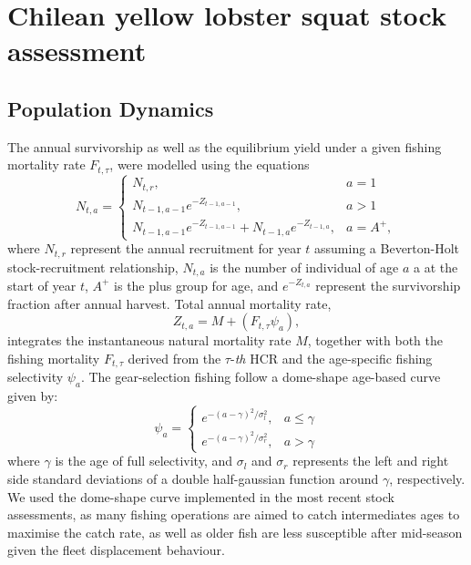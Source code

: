 \setlength{\parindent}{25pt}
\setlength{\parskip}{0em}
\fontsize{11}{14}\selectfont

\clearpage

\appendix
\section{Chilean yellow lobster squat stock assessment} \label{app:model}
\subsection{Population Dynamics}

The annual survivorship as well as the equilibrium 
yield under a given fishing mortality rate $F_{t,\tau}$, were modelled 
using the equations
\[ 
N_{t,a}=\begin{cases} N_{t,r}, & a=1\\
N_{t-1,a-1}e^{-Z_{t-1,a-1}},& a>1\\
N_{t-1,a-1}e^{-Z_{t-1,a-1}} + N_{t-1,a}e^{-Z_{t-1,a}},& a=A^+,
\end{cases}  
\]
where $N_{t,r}$ represent the annual recruitment for year $t$ 
assuming a Beverton-Holt stock-recruitment relationship,  
$N_{t,a}$ is the number of individual 
of age $a$ a at the start of year $t$, $A^+$ is the plus group for age, and $e^{-Z_{t,a}}$ represent
the survivorship fraction after annual harvest. 
Total annual mortality rate,
\[ 
Z_{t,a}= M+\left( F_{t,\tau}\psi_{a}\right), 
\]
integrates the instantaneous 
natural mortality rate $M$, together with both the fishing mortality $F_{t,\tau}$
derived from the $\tau$-\textit{th} HCR and the age-specific 
fishing selectivity $\psi_a$. The gear-selection fishing follow a dome-shape age-based curve given by:
\[ 
\psi_{a}=\begin{cases}e^{-(a-\gamma)^2 / \sigma^{2}_l}, & a\leq \gamma\\
e^{-(a-\gamma)^2 / \sigma^{2}_r}, & a > \gamma
\end{cases}  
\]
where $\gamma$ is the age of full selectivity, and $\sigma_l$ and 
$\sigma_r$ represents the left and right side standard deviations 
of a double half-gaussian function around $\gamma$, respectively. We used the dome-shape curve implemented in the most recent stock assessments, as many fishing operations are aimed to catch intermediates ages to maximise the catch rate, as well as  older fish are less susceptible after mid-season given the fleet displacement behaviour.

\clearpage

